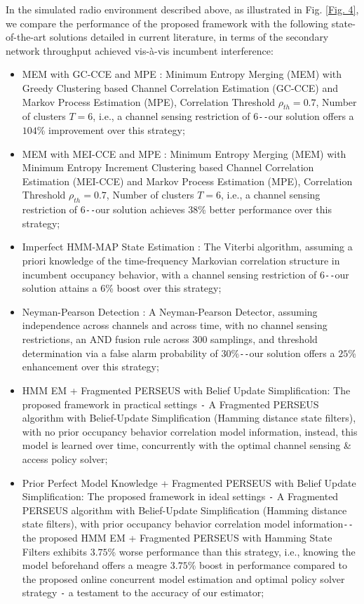 \documentclass[12pt, draftcls, onecolumn]{IEEEtran}
\begin{document}
In the simulated radio environment described above, as illustrated in Fig. \ref{Fig. 4}, we compare the performance of the proposed framework with the following state-of-the-art solutions detailed in current literature, in terms of the secondary network throughput achieved vis-à-vis incumbent interference:
\begin{itemize}
    \item MEM with GC-CCE and MPE \cite{WCL:7}: Minimum Entropy Merging (MEM) with Greedy Clustering based Channel Correlation Estimation (GC-CCE) and Markov Process Estimation (MPE), Correlation Threshold $\rho_{th}{=}0.7$, Number of clusters $T{=}6$, i.e., a channel sensing restriction of $6$\texttt{-{}-}our solution offers a $104$\% improvement over this strategy;
    \item MEM with MEI-CCE and MPE \cite{WCL:7}: Minimum Entropy Merging (MEM) with Minimum Entropy Increment Clustering based Channel Correlation Estimation (MEI-CCE) and Markov Process Estimation (MPE), Correlation Threshold $\rho_{th}{=}0.7$, Number of clusters $T{=}6$, i.e., a channel sensing restriction of $6$\texttt{-{}-}our solution achieves $38$\% better performance over this strategy;
    \item Imperfect HMM-MAP State Estimation \cite{WCL:6}: The Viterbi algorithm, assuming a priori knowledge of the time-frequency Markovian correlation structure in incumbent occupancy behavior, with a channel sensing restriction of $6$\texttt{-{}-}our solution attains a $6$\% boost over this strategy;
    \item Neyman-Pearson Detection \cite{WCL:11}: A Neyman-Pearson Detector, assuming independence across channels and across time, with no channel sensing restrictions, an AND fusion rule across $300$ samplings, and threshold determination via a false alarm probability of $30$\%\texttt{-{}-}our solution offers a $25$\% enhancement over this strategy;
    \item HMM EM + Fragmented PERSEUS with Belief Update Simplification: The proposed framework in practical settings \texttt{-} A Fragmented PERSEUS algorithm with Belief-Update Simplification (Hamming distance state filters), with no prior occupancy behavior correlation model information, instead, this model is learned over time, concurrently with the optimal channel sensing \& access policy solver;
    \item Prior Perfect Model Knowledge + Fragmented PERSEUS with Belief Update Simplification: The proposed framework in ideal settings \texttt{-} A Fragmented PERSEUS algorithm with Belief-Update Simplification (Hamming distance state filters), with prior occupancy behavior correlation model information\texttt{-{}-}the proposed HMM EM + Fragmented PERSEUS with Hamming State Filters exhibits $3.75$\% worse performance than this strategy, i.e., knowing the model beforehand offers a meagre $3.75$\% boost in performance compared to the proposed online concurrent model estimation and optimal policy solver strategy \texttt{-} a testament to the accuracy of our estimator;

\end{itemize}
\end{document}

